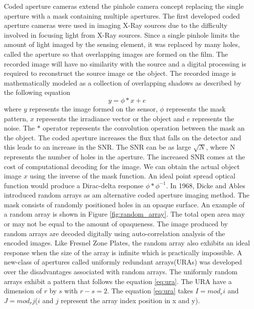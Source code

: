 Coded aperture cameras extend the pinhole camera concept replacing the single aperture with a mask containing multiple apertures. The first developed coded aperture cameras were used in imaging X-Ray sources due to the difficulty involved in focusing light from X-Ray sources\cite{Cannon1}. Since a single pinhole limits the amount of light imaged by the sensing element, it was replaced by many holes, called the aperture so that overlapping images are formed on the film. The recorded image will have no similarity with the source and a digital processing is required to reconstruct the source image or the object. The recorded image is mathematically modeled as a  collection of overlapping shadows as described by the following equation\cite{VBoomi}\cite{Cannon1} 
\begin{equation}
y = \phi * x + e
\label{eq:conv}
\end{equation}
where $y$ represents the image formed on the sensor, $\phi$ represents the mask pattern, $x$ represents the irradiance vector or the object and $e$ represents the noise. The $*$ operator represents the convolution operation between the mask an the object. The coded aperture increases the flux that falls on the detector and this leads to an increase in the SNR. The SNR can be as large $\sqrt{N}$, where N represents the number of holes in the aperture\cite{Cannon1}. The increased SNR comes at the cost of computational decoding for the image. We can obtain the actual object image $x$ using the inverse of the mask function. An ideal point spread optical function would produce a Dirac-delta response $\phi * \phi^{-1}$.
In 1968, Dicke and Ables\cite{Cannon1} introduced random arrays as am alternative coded aperture imaging method. The mask consists of randomly positioned holes in an opaque surface. An example of a random array is shown in Figure \ref{fig:random_array}. The total open area may or may not be equal to the amount of opaqueness. The image produced by random arrays are decoded digitally using auto-correlation analysis of the encoded images\cite{Cannon1}. Like Fresnel Zone Plates, the random array also exhibits an ideal response when the size of the array is infinite which is practically impossible. A new-class of apertures called uniformly redundant arrays(URAs) was developed over the disadvantages associated with random arrays. The uniformly random arrays exhibit a pattern that follows the equation \ref{eq:ura}\cite{Fenimore:78}. The URA have a dimension of $r$ by $s$ with $r - s = 2$. The equation \ref{eq:ura} takes $I  = mod_ri$ and $J  = mod_rj$($i$ and $j$ represent the array index position in x and y).
